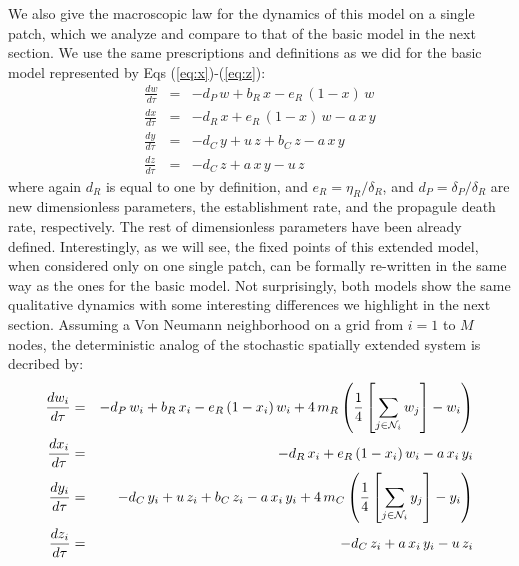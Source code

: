 We also give the macroscopic law for the dynamics of this model on a single patch, which we analyze and compare to that of the basic model in the next section. We use the same prescriptions and definitions as we did for the basic model represented by Eqs (\ref{eq:x})-(\ref{eq:z}):
\begin{eqnarray}
\label{eq:ww}
\frac{dw}{d\tau}   & = & -d_P \,w + b_R\,x - e_R\,(1-x)\,w \\
\label{eq:xx}
\frac{dx}{d\tau}   & = & -d_R \,x + e_R\,(1-x)\,w -a\,x\,y \\
\label{eq:yy}
\frac{dy}{d\tau}   & = & -d_C \,y + u\,z + b_C\,z -a\,x\,y \\
\label{eq:zz}
\frac{dz}{d\tau}   & = & -d_C \,z + a\,x\,y -u\,z 
\end{eqnarray}
where again $d_R$ is equal to one by definition, and $e_R=\eta_R/\delta_R$, and $d_P = \delta_P/\delta_R$ are new dimensionless parameters, the establishment rate, and the propagule death rate, respectively. The rest of dimensionless parameters have been already defined. Interestingly, as we will see, the fixed points of this extended model, when considered only on one single patch, can be formally re-written in the same way as the ones for the basic model. Not surprisingly, both models show the same qualitative dynamics with some interesting differences we highlight in the next section. Assuming a Von Neumann neighborhood on a grid from $i=1$ to $M$ nodes, the deterministic analog of the stochastic spatially extended system is decribed by: 
\begin{eqnarray}
\label{eq:wwsd}
\frac{dw_i}{d\tau}   & = & -d_P \,w_i + b_R\,x_i - e_R\,(1-x_i)\,w_i + 4\,m_R \left(\frac{1}{4} \left[\sum_{j \in {\cal N}_i} w_j\right] - w_i\right)\\
\label{eq:xxsd}
\frac{dx_i}{d\tau}   & = & -d_R \,x_i + e_R\,(1-x_i)\,w_i -a\,x_i\,y_i \\
\label{eq:yysd}
\frac{dy_i}{d\tau}   & = & -d_C \,y_i + u\,z_i + b_C\,z_i -a\,x_i\,y_i + 4\,m_C \left(\frac{1}{4} \left[\sum_{j \in {\cal N}_i} y_j\right] - y_i\right)\\
\label{eq:zzsd}
\frac{dz_i}{d\tau}   & = & -d_C \,z_i + a\,x_i\,y_i -u\,z_i 
\end{eqnarray}

